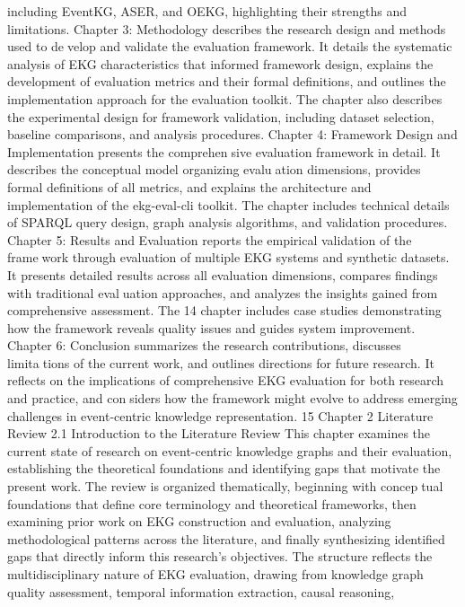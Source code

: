 including EventKG, ASER, and OEKG, highlighting their strengths and limitations.
Chapter 3: Methodology describes the research design and methods used to develop and validate the evaluation framework. It details the systematic analysis of EKG
characteristics that informed framework design, explains the development of evaluation
metrics and their formal definitions, and outlines the implementation approach for the
evaluation toolkit. The chapter also describes the experimental design for framework
validation, including dataset selection, baseline comparisons, and analysis procedures.
Chapter 4: Framework Design and Implementation presents the comprehensive evaluation framework in detail. It describes the conceptual model organizing evaluation dimensions, provides formal definitions of all metrics, and explains the architecture
and implementation of the ekg-eval-cli toolkit. The chapter includes technical details of
SPARQL query design, graph analysis algorithms, and validation procedures.
Chapter 5: Results and Evaluation reports the empirical validation of the framework through evaluation of multiple EKG systems and synthetic datasets. It presents
detailed results across all evaluation dimensions, compares findings with traditional evaluation approaches, and analyzes the insights gained from comprehensive assessment. The
14
chapter includes case studies demonstrating how the framework reveals quality issues and
guides system improvement.
Chapter 6: Conclusion summarizes the research contributions, discusses limitations of the current work, and outlines directions for future research. It reflects on the
implications of comprehensive EKG evaluation for both research and practice, and considers how the framework might evolve to address emerging challenges in event-centric
knowledge representation.
15
Chapter 2
Literature Review
2.1 Introduction to the Literature Review
This chapter examines the current state of research on event-centric knowledge graphs
and their evaluation, establishing the theoretical foundations and identifying gaps that
motivate the present work. The review is organized thematically, beginning with conceptual foundations that define core terminology and theoretical frameworks, then examining
prior work on EKG construction and evaluation, analyzing methodological patterns across
the literature, and finally synthesizing identified gaps that directly inform this research’s
objectives.
The structure reflects the multidisciplinary nature of EKG evaluation, drawing from
knowledge graph quality assessment, temporal information extraction, causal reasoning,
